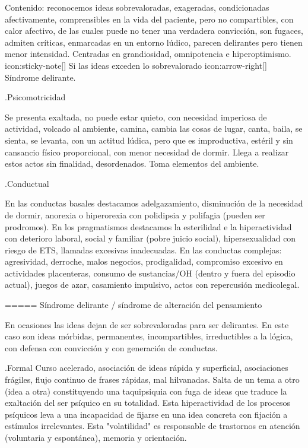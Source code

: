 \documentclass[encares.tex]{subfiles}
\begin{document}
Contenido: reconocemos ideas sobrevaloradas, exageradas, condicionadas afectivamente, comprensibles en la vida del paciente, pero no compartibles, con calor afectivo, de las cuales puede no tener una verdadera convicción, son fugaces, admiten críticas, enmarcadas en un entorno lúdico, parecen delirantes pero tienen menor intensidad. Centradas en grandiosidad, omnipotencia e hiperoptimismo. icon:sticky-note[] Si las ideas exceden lo sobrevalorado icon:arrow-right[] Síndrome delirante.

.Psicomotricidad

Se presenta exaltada, no puede estar quieto, con necesidad imperiosa de actividad, volcado al ambiente, camina, cambia las cosas de lugar, canta, baila, se sienta, se levanta, con un actitud lúdica, pero que es improductiva, estéril y sin cansancio físico proporcional, con menor necesidad de dormir. Llega a realizar estos actos sin finalidad, desordenados. Toma elementos del ambiente.

.Conductual

En las conductas basales destacamos adelgazamiento, disminución de la necesidad de dormir, anorexia o hiperorexia con polidipsia y polifagia (pueden ser prodromos). En los pragmatismos destacamos la esterilidad e la hiperactividad con deterioro laboral, social y familiar (pobre juicio social), hipersexualidad con riesgo de ETS, llamadas excesivas inadecuadas. En las conductas complejas: agresividad, derroche, malos negocios, prodigalidad, compromiso excesivo en actividades placenteras, consumo de sustancias/OH (dentro y fuera del episodio actual), juegos de azar, casamiento impulsivo, actos con repercusión medicolegal.

===== Síndrome delirante / síndrome de alteración del pensamiento

En ocasiones las ideas dejan de ser sobrevaloradas para ser delirantes. En este caso son ideas mórbidas, permanentes, incompartibles, irreductibles a la lógica, con defensa con convicción y con generación de conductas.

.Formal
Curso acelerado, asociación de ideas rápida y superficial, asociaciones frágiles, flujo continuo de frases rápidas, mal hilvanadas. Salta de un tema a otro (idea a otra) constituyendo una taquipsiquia con fuga de ideas que traduce la exaltación del ser psíquico en su totalidad. Esta hiperactividad de los procesos psíquicos leva a una incapacidad de fijarse en una idea concreta con fijación a estímulos irrelevantes. Esta "volatilidad" es responsable de trastornos en atención (voluntaria y espontánea), memoria y orientación.
\end{document}
